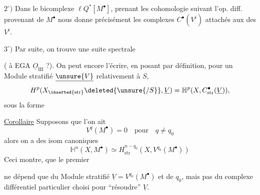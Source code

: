 $2^\circ)$ Dans le bicomplexe $\ell Q^*[M^\bullet]$, prenant les  cohomologie suivant l'op. diff. provenant de $M^\bullet$ nous donne précisément les  complexes $C^\bullet(V^i)$ attachés aux  des $V^i$.

$3^\circ)$ Par suite, on trouve une suite spectrale

( à EGA $\underline O_{\mathrm{III}}$ ?). On peut encore l'écrire, en posant par définition, pour un Module stratifié $\underline{\unsure{V}}$ relativement à $S$,
\[
H^p(X_{\inserted{\mathrm{str}}}\deleted{\unsure{/S}},\underline V)
=\mathbb H^p(X,C^\bullet_{\mathrm{str}}(\underline V)),
\]
sous la forme
\diagram{\[\boxed{\begin{gathered}
\begin{tikzcd}[ampersand replacement=\&,column sep=small]
\mathbb H^*(X,M^\bullet)\&E_2^{pq}=H^p_{\deleted{\unsure{\mathrm{str}}}}(X_{\inserted{\mathrm{str}}},V^q(M^\bullet))\arrow[l,Rightarrow]
\end{tikzcd}\\[1em]
\text{où}\qquad V^q(M^\bullet)=\mathcal H^q(Q^0[M^\bullet])
\end{gathered}}\]}

\uline{Corollaire} Supposons que l'on ait
\[
V^q(M^\bullet)=0\quad\text{pour}\quad q\neq q_0
\]
alors on a des isom canoniques
\[
\mathbb H^n(X,M^\bullet)\simeq H^{n-q_0}_{\mathrm{str}}(X,V^{q_0}(M^\bullet))
\]
Ceci montre,  que le premier 

ne dépend que du Module stratifié $\underline V=V^{q_0}(M^\bullet)$ et de  $q_0$, mais pas du complexe différentiel particulier choisi pour ``résoudre'' $\underline V$.

